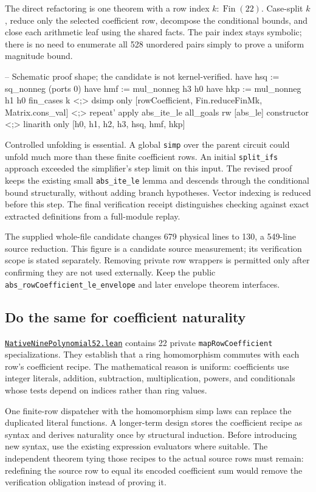 \documentclass[11pt,letterpaper]{article}
\newcommand{\code}[1]{\nolinkurl{#1}}
\newcommand{\src}[2]{\href{https://github.com/VladimirReshetnikov/ProveIt/blob/60e9c5d620c6c387d932876cfa2d9376f64ea56c/Computability/DiophantineConsistency/Lean/DiophantineConsistency/#1.lean}{\code{#1.lean}}#2}
\begin{document}
The direct refactoring is one theorem with a row index $k:\operatorname{Fin}(22)$.
Case-split $k$, reduce only the selected coefficient row, decompose the conditional
bounds, and close each arithmetic leaf using the shared facts. The
pair index stays symbolic; there is no need to enumerate all 528 unordered
pairs simply to prove a uniform magnitude bound.

\begin{Lean}
-- Schematic proof shape; the candidate is not kernel-verified.
have hsq := sq_nonneg (ports 0)
have hmf := mul_nonneg h3 h0
have hkp := mul_nonneg h1 h0
fin_cases k <;>
  dsimp only [rowCoefficient, Fin.reduceFinMk, Matrix.cons_val] <;>
  repeat' apply abs_ite_le
all_goals
  rw [abs_le]
  constructor <;>
    linarith only [h0, h1, h2, h3, hsq, hmf, hkp]
\end{Lean}

Controlled unfolding is essential. A global \code{simp} over the parent circuit
could unfold much more than these finite coefficient rows. An initial
\code{split_ifs} approach exceeded the simplifier's step limit on this input.
The revised proof keeps the existing small \code{abs_ite_le} lemma and descends
through the conditional bound structurally, without adding branch hypotheses.
Vector indexing is reduced before this step. The final verification receipt
distinguishes checking against exact extracted definitions from a full-module
replay.

The supplied whole-file candidate changes 679 physical lines to 130, a
549-line source reduction. This figure is a candidate source measurement;
its verification scope is stated separately. Removing private row wrappers
is permitted only after confirming they are not used externally. Keep the
public \code{abs_rowCoefficient_le_envelope} and later envelope theorem interfaces.

\subsection{Do the same for coefficient naturality}

\src{NativeNinePolynomial52}{ contains 22 private
\code{mapRowCoefficient} specializations.}
They establish that a ring homomorphism commutes with each row's coefficient
recipe. The mathematical reason is uniform: coefficients use integer literals,
addition, subtraction, multiplication, powers, and conditionals whose tests
depend on indices rather than ring values.

One finite-row dispatcher with the homomorphism simp laws can replace the
duplicated literal functions. A longer-term design stores the coefficient
recipe as syntax and derives naturality once by structural induction. Before
introducing new syntax, use the existing expression evaluators where suitable.
The independent theorem tying those recipes to the actual source rows must
remain: redefining the source row to equal its encoded coefficient sum would
remove the verification obligation instead of proving it.
\end{document}
